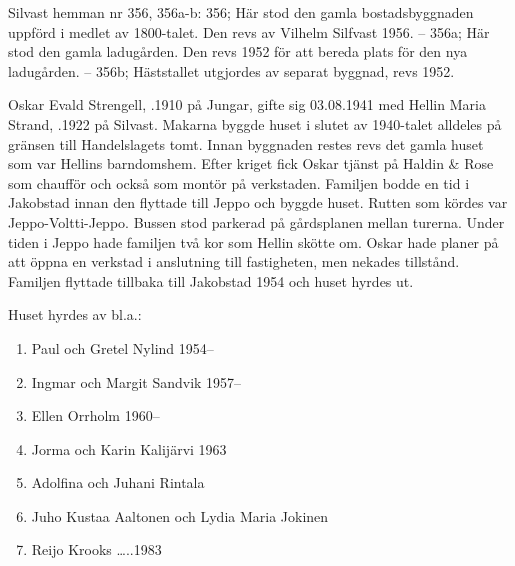 Silvast hemman nr 356, 356a-b:
356; Här stod den gamla bostadsbyggnaden uppförd i medlet av 1800-talet. Den revs av Vilhelm Silfvast 1956. -- 356a; Här stod den gamla ladugården. Den revs 1952 för att bereda plats för den nya ladugården. -- 356b; Häststallet utgjordes av separat byggnad, revs 1952.




Oskar Evald Strengell, .1910 på Jungar, gifte sig 03.08.1941 med Hellin Maria Strand, .1922 på Silvast. Makarna byggde huset i slutet av 1940-talet alldeles på gränsen till Handelslagets tomt. Innan byggnaden restes revs det gamla huset som var Hellins barndomshem. Efter kriget fick Oskar tjänst på Haldin \& Rose som chaufför och också som montör på verkstaden. Familjen bodde en tid i Jakobstad innan den flyttade till Jeppo och byggde huset. Rutten som kördes var Jeppo-Voltti-Jeppo. Bussen stod parkerad på gårdsplanen mellan turerna. Under tiden i Jeppo hade familjen två kor som Hellin skötte om. Oskar hade planer på att öppna en verkstad i anslutning till fastigheten, men nekades tillstånd. Familjen flyttade tillbaka till Jakobstad 1954 och huset hyrdes ut.
\begin{jhchildren}
  \item {}
  \item {}
\end{jhchildren}


Huset hyrdes av bl.a.:
\begin{enumerate}
  \item Paul och Gretel Nylind  1954--
  \item Ingmar och Margit Sandvik 1957--
  \item Ellen Orrholm 1960--
  \item Jorma och Karin Kalijärvi 1963
  \item Adolfina och Juhani Rintala
  \item Juho Kustaa Aaltonen och Lydia Maria Jokinen
  \item Reijo Krooks   …..1983
\end{enumerate}

